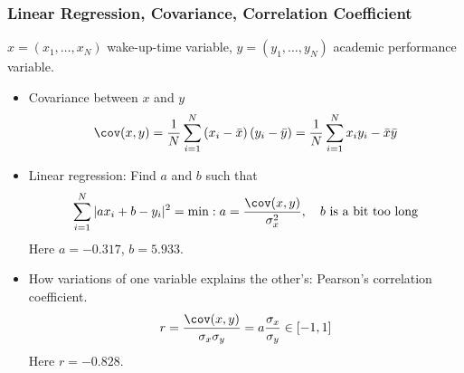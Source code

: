 \documentclass[9pt]{beamer}
\begin{document}
\begin{frame}\frametitle{Linear Regression, Covariance, Correlation Coefficient}  
  $x = (x_1,\dots, x_N)$ wake-up-time variable, $y = (y_1,\dots,y_N)$ academic performance variable.
  \begin{itemize}
 \item Covariance between $x$ and $y$
    $$
    \cov(x,y) = \frac{1}{N}\sum_{i=1}^{N}\left(x_i-\bar{x}\right)\left(y_i - \bar{y}\right) = \frac{1}{N}\sum_{i=1}^Nx_iy_i - \bar{x}\bar{y}
    $$
  \item Linear regression: Find $a$ and $b$ such that 
    $$
    \sum_{i=1}^N|ax_i + b - y_i|^2 = \min: a = \frac{\cov(x,y)}{\sigma^2_x},\quad b \text{ is a bit too long}
    $$
    Here $a = -0.317$, $b = 5.933$. 
  \item How variations of one variable explains the other's: Pearson's correlation coefficient. 
    $$
    r = \frac{\cov(x,y)}{\sigma_x \sigma_y} = a\frac{\sigma_x}{\sigma_y}\in [-1,1]
    $$
    Here $r = -0.828$.
  \end{itemize}
\end{frame}
\end{document}
